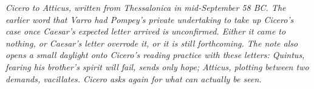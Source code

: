 
\textit{Cicero to Atticus, written from Thessalonica in
mid-September 58 BC. The earlier word that Varro had Pompey's
private undertaking to take up Cicero's case once Caesar's
expected letter arrived is unconfirmed. Either it came to
nothing, or Caesar's letter overrode it, or it is still
forthcoming. The note also opens a small daylight onto
Cicero's reading practice with these letters: Quintus, fearing
his brother's spirit will fail, sends only hope; Atticus,
plotting between two demands, vacillates. Cicero asks again
for what can actually be seen.}

